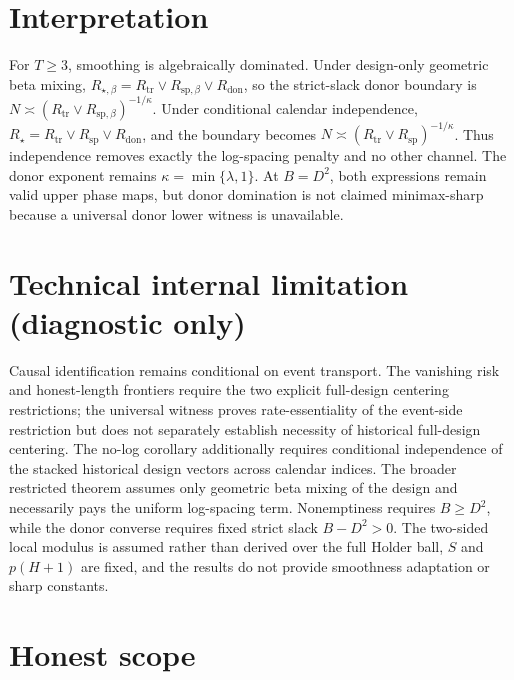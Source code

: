 \documentclass{article}
\begin{document}
\section{Interpretation}

For \(T\ge3\), smoothing is algebraically dominated. Under design-only geometric beta mixing, \(R_{\star,\beta}=R_{\mathrm{tr}}\vee R_{\mathrm{sp},\beta}\vee R_{\mathrm{don}}\), so the strict-slack donor boundary is \(N\asymp(R_{\mathrm{tr}}\vee R_{\mathrm{sp},\beta})^{-1/\kappa}\). Under conditional calendar independence, \(R_\star=R_{\mathrm{tr}}\vee R_{\mathrm{sp}}\vee R_{\mathrm{don}}\), and the boundary becomes \(N\asymp(R_{\mathrm{tr}}\vee R_{\mathrm{sp}})^{-1/\kappa}\). Thus independence removes exactly the log-spacing penalty and no other channel. The donor exponent remains \(\kappa=\min\{\lambda,1\}\). At \(B=D^2\), both expressions remain valid upper phase maps, but donor domination is not claimed minimax-sharp because a universal donor lower witness is unavailable.

\section*{Technical internal limitation (diagnostic only)}

Causal identification remains conditional on event transport.  The vanishing risk and honest-length frontiers require the two explicit full-design centering restrictions; the universal witness proves rate-essentiality of the event-side restriction but does not separately establish necessity of historical full-design centering.  The no-log corollary additionally requires conditional independence of the stacked historical design vectors across calendar indices.  The broader restricted theorem assumes only geometric beta mixing of the design and necessarily pays the uniform log-spacing term.  Nonemptiness requires \(B\ge D^2\), while the donor converse requires fixed strict slack \(B-D^2>0\).  The two-sided local modulus is assumed rather than derived over the full Holder ball, \(S\) and \(p(H+1)\) are fixed, and the results do not provide smoothness adaptation or sharp constants.

\section{Honest scope}
\end{document}
